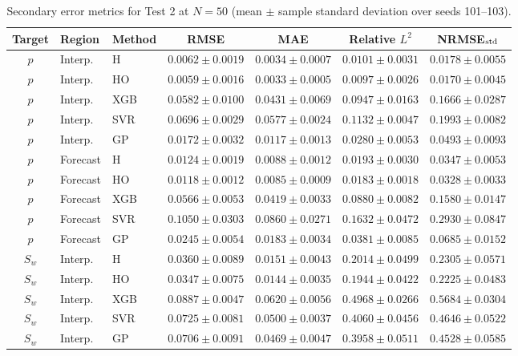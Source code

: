 \begin{table}[t]
\centering
\scriptsize
\setlength{\tabcolsep}{2.7pt}
\caption{Secondary error metrics for Test 2 at $N=50$ (mean $\pm$ sample standard deviation over seeds 101--103).}
\label{tab:secondary_test2}
\begin{tabular}{@{}cllcccc@{}}
\toprule
Target & Region & Method & RMSE & MAE & Relative $L^2$ & NRMSE$_{\rm std}$ \\
\midrule
$p$ & Interp. & H & $0.0062\pm0.0019$ & $0.0034\pm0.0007$ & $0.0101\pm0.0031$ & $0.0178\pm0.0055$ \\
$p$ & Interp. & HO & $0.0059\pm0.0016$ & $0.0033\pm0.0005$ & $0.0097\pm0.0026$ & $0.0170\pm0.0045$ \\
$p$ & Interp. & XGB & $0.0582\pm0.0100$ & $0.0431\pm0.0069$ & $0.0947\pm0.0163$ & $0.1666\pm0.0287$ \\
$p$ & Interp. & SVR & $0.0696\pm0.0029$ & $0.0577\pm0.0024$ & $0.1132\pm0.0047$ & $0.1993\pm0.0082$ \\
$p$ & Interp. & GP & $0.0172\pm0.0032$ & $0.0117\pm0.0013$ & $0.0280\pm0.0053$ & $0.0493\pm0.0093$ \\
\addlinespace[1pt]
$p$ & Forecast & H & $0.0124\pm0.0019$ & $0.0088\pm0.0012$ & $0.0193\pm0.0030$ & $0.0347\pm0.0053$ \\
$p$ & Forecast & HO & $0.0118\pm0.0012$ & $0.0085\pm0.0009$ & $0.0183\pm0.0018$ & $0.0328\pm0.0033$ \\
$p$ & Forecast & XGB & $0.0566\pm0.0053$ & $0.0419\pm0.0033$ & $0.0880\pm0.0082$ & $0.1580\pm0.0147$ \\
$p$ & Forecast & SVR & $0.1050\pm0.0303$ & $0.0860\pm0.0271$ & $0.1632\pm0.0472$ & $0.2930\pm0.0847$ \\
$p$ & Forecast & GP & $0.0245\pm0.0054$ & $0.0183\pm0.0034$ & $0.0381\pm0.0085$ & $0.0685\pm0.0152$ \\
\addlinespace[1pt]
\midrule
$S_w$ & Interp. & H & $0.0360\pm0.0089$ & $0.0151\pm0.0043$ & $0.2014\pm0.0499$ & $0.2305\pm0.0571$ \\
$S_w$ & Interp. & HO & $0.0347\pm0.0075$ & $0.0144\pm0.0035$ & $0.1944\pm0.0422$ & $0.2225\pm0.0483$ \\
$S_w$ & Interp. & XGB & $0.0887\pm0.0047$ & $0.0620\pm0.0056$ & $0.4968\pm0.0266$ & $0.5684\pm0.0304$ \\
$S_w$ & Interp. & SVR & $0.0725\pm0.0081$ & $0.0500\pm0.0037$ & $0.4060\pm0.0456$ & $0.4646\pm0.0522$ \\
$S_w$ & Interp. & GP & $0.0706\pm0.0091$ & $0.0469\pm0.0047$ & $0.3958\pm0.0511$ & $0.4528\pm0.0585$ \\

\end{tabular}
\end{table}
